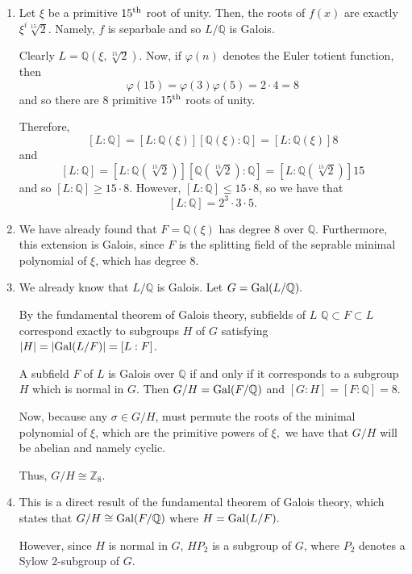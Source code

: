 \documentclass[12pt]{AlgebraQual}
\begin{document}
\begin{solution}$\,$
\begin{enumerate}[label=(\alph*)]
    \item Let $\xi$ be a primitive $15^\text{th}$ root of unity. Then, the roots of $f(x)$ are exactly $\xi^i\sqrt[15]{2}$. Namely, $f$ is separbale and so $L/\mathbb{Q}$ is Galois.

    Clearly $L=\mathbb{Q}(\xi,\sqrt[15]{2})$. Now, if $\varphi(n)$ denotes the Euler totient function, then $$\varphi(15)=\varphi(3)\varphi(5)=2\cdot 4=8$$ and so there are $8$ primitive $15^\text{th}$ roots of unity.

    Therefore, $$[L:\mathbb{Q}]=[L:\mathbb{Q}(\xi)][\mathbb{Q}(\xi):\mathbb{Q}]=[L:\mathbb{Q}(\xi)]8$$ and $$[L:\mathbb{Q}]=[L:\mathbb{Q}(\sqrt[15]{2})][\mathbb{Q}(\sqrt[15]{2}):\mathbb{Q}]=[L:\mathbb{Q}(\sqrt[15]{2})]15$$ and so $[L:\mathbb{Q}]\ge 15\cdot 8$. However, $[L:\mathbb{Q}]\le 15\cdot 8$, so we have that $$[L:\mathbb{Q}]=2^3\cdot 3\cdot 5.$$
    \item We have already found that $F=\mathbb{Q}(\xi)$ has degree $8$ over $\mathbb{Q}$. Furthermore, this extension is Galois, since $F$ is the splitting field of the seprable minimal polynomial of $\xi$, which has degree $8.$

    \item We already know that $L/\mathbb{Q}$ is Galois. Let $G=\text{Gal}(L/\mathbb{Q}).$

    By the fundamental theorem of Galois theory, subfields of $L$ $\mathbb{Q}\subset F\subset L$ correspond exactly to subgroups $H$ of $G$ satisfying $|H|=|\text{Gal}(L/F)|=[L:F]$.

    A subfield $F$ of $L$ is Galois over $\mathbb{Q}$ if and only if it corresponds to a subgroup $H$ which is normal in $G$. Then $G/H=\text{Gal}(F/\mathbb{Q})$ and $[G:H]=[F:\mathbb{Q}]=8$.

    Now, because any $\sigma\in G/H$, must permute the roots of the minimal polynomial of $\xi$, which are the primitive powers of $\xi,$ we have that $G/H$ will be abelian and namely cyclic.

    Thus, $G/H\cong\mathbb{Z}_8$.

    \item This is a direct result of the fundamental theorem of Galois theory, which states that $G/H\cong \text{Gal}(F/\mathbb{Q})$ where $H=\text{Gal}(L/F).$

    However, since $H$ is normal in $G$, $HP_2$ is a subgroup of $G$, where $P_2$ denotes a Sylow $2$-subgroup of $G.$


\end{enumerate}
\end{solution}
\end{document}
